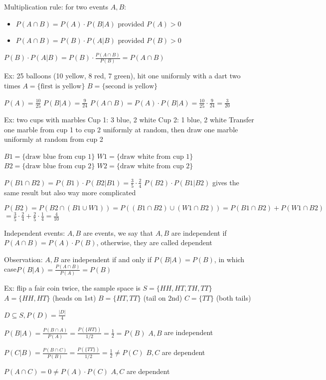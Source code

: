 \documentclass{article}
\begin{document}
Multiplication rule: for two events $A,B$:
\begin{itemize}
    \item $P(A\cap B)=P(A)\cdot P(B\vert A)$ provided $P(A)>0$
    \item $P(A\cap B)=P(B)\cdot P(A\vert B)$ provided $P(B)>0$
\end{itemize}

$P(B)\cdot P(A\vert B)=P(B)\cdot\frac{P(A\cap B)}{P(B)}=P(A\cap B)$

Ex: 25 balloons (10 yellow, 8 red, 7 green), hit one uniformly with a dart two times
$A=\{\text{first is yellow}\}$
$B=\{\text{second is yellow}\}$

$P(A)=\frac{10}{25}$
$P(B\vert A)=\frac{9}{24}$
$P(A\cap B)=P(A)\cdot P(B\vert A)=\frac{10}{25}\cdot\frac{9}{24}=\frac{3}{20}$

Ex: two cups with marbles
Cup 1: 3 blue, 2 white
Cup 2: 1 blue, 2 white
Transfer one marble from cup 1 to cup 2 uniformly at random, then draw one marble uniformly at random from cup 2

$B1=\{\text{draw blue from cup 1}\}$
$W1=\{\text{draw white from cup 1}\}$
$B2=\{\text{draw blue from cup 2}\}$
$W2=\{\text{draw white from cup 2}\}$

$P(B1\cap B2)=P(B1)\cdot P(B2\vert B1)=\frac{3}{5}\cdot\frac{2}{4}$
$P(B2)\cdot P(B1\vert B2)$ gives the same result but also way more complicated

$P(B2)=P(B2\cap(B1\cup W1))=P((B1\cap B2)\cup(W1\cap B2))=P(B1\cap B2)+P(W1\cap B2)$
$=\frac{3}{5}\cdot\frac{2}{4}+\frac{2}{5}\cdot\frac{1}{4}=\frac{4}{10}$

Independent events: $A,B$ are events, we say that $A,B$ are independent if $P(A\cap B)=P(A)\cdot P(B)$, otherwise, they are called dependent

Observation: $A,B$ are independent if and only if $P(B\vert A)=P(B)$, in which case$P(B\vert A)=\frac{P(A\cap B)}{P(A)}=P(B)$

Ex: flip a fair coin twice, the sample space is $S=\{HH,HT,TH,TT\}$
$A=\{HH,HT\}$ (heads on 1st)
$B=\{HT,TT\}$ (tail on 2nd)
$C=\{TT\}$ (both tails)

$D\subseteq S,P(D)=\frac{\lvert D\rvert}{4}$

$P(B\vert A)=\frac{P(B\cap A)}{P(A)}=\frac{P(\{HT\})}{1/2}=\frac{1}{2}=P(B)$
$A,B$ are independent

$P(C\vert B)=\frac{P(B\cap C)}{P(B)}=\frac{P(\{TT\})}{1/2}=\frac{1}{2}\neq P(C)$
$B,C$ are dependent

$P(A\cap C)=0\neq P(A)\cdot P(C)$
$A,C$ are dependent
\end{document}
